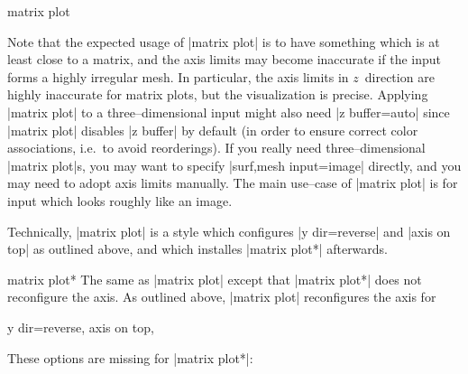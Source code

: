 {\begin{plottype}[/pgfplots]{matrix plot}
\begin{codeexample}[]
\end{codeexample}
	Note that the expected usage of |matrix plot| is to have something which is at least close to a matrix, and the axis limits may become inaccurate if the input forms a highly irregular mesh. In particular, the axis limits in $z$~direction are highly inaccurate for matrix plots, but the visualization is precise. Applying |matrix plot| to a three--dimensional input might also need |z buffer=auto| since |matrix plot| disables |z buffer| by default (in order to ensure correct color associations, i.e.\ to avoid reorderings). If you really need three--dimensional |matrix plot|s, you may want to specify |surf,mesh input=image| directly, and you may need to adopt axis limits manually. The main use--case of |matrix plot| is for input which looks roughly like an image.
	
	Technically, |matrix plot| is a style which configures |y dir=reverse| and |axis on top| as outlined above, and which installes |matrix plot*| afterwards.
\end{plottype}

\begin{plottype}{matrix plot*}
	The same as |matrix plot| except that |matrix plot*| does not reconfigure the axis. As outlined above, |matrix plot| reconfigures the axis for
\begin{codeexample}
y dir=reverse,
axis on top,
\end{codeexample}
	
	These options are missing for |matrix plot*|:
\begin{codeexample}[]
\end{codeexample}
\end{plottype}}
